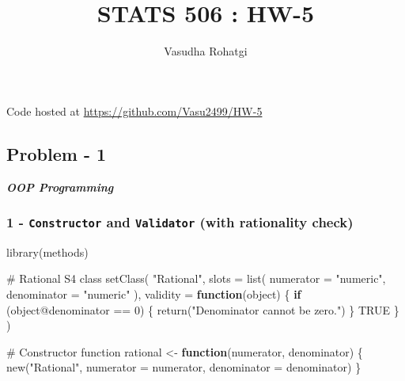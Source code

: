 \documentclass[
  12pt,
]{article}
\title{STATS 506 : HW-5}
\author{Vasudha Rohatgi}
\date{}
\makeatletter
\let\oldparagraph\paragraph
\renewcommand{\paragraph}{
    \@ifstar
      \xxxParagraphStar
      \xxxParagraphNoStar
  }
\newcommand{\xxxParagraphStar}[1]{\oldparagraph*{#1}\mbox{}}
\newcommand{\xxxParagraphNoStar}[1]{\oldparagraph{#1}\mbox{}}
\newenvironment{Shaded}{\begin{snugshade}}{\end{snugshade}}
\newcommand{\AttributeTok}[1]{\textcolor[rgb]{0.40,0.45,0.13}{#1}}
\newcommand{\CommentTok}[1]{\textcolor[rgb]{0.37,0.37,0.37}{#1}}
\newcommand{\ConstantTok}[1]{\textcolor[rgb]{0.56,0.35,0.01}{#1}}
\newcommand{\ControlFlowTok}[1]{\textcolor[rgb]{0.00,0.23,0.31}{\textbf{#1}}}
\newcommand{\DecValTok}[1]{\textcolor[rgb]{0.68,0.00,0.00}{#1}}
\newcommand{\FunctionTok}[1]{\textcolor[rgb]{0.28,0.35,0.67}{#1}}
\newcommand{\NormalTok}[1]{\textcolor[rgb]{0.00,0.23,0.31}{#1}}
\newcommand{\OtherTok}[1]{\textcolor[rgb]{0.00,0.23,0.31}{#1}}
\newcommand{\SpecialCharTok}[1]{\textcolor[rgb]{0.37,0.37,0.37}{#1}}
\newcommand{\StringTok}[1]{\textcolor[rgb]{0.13,0.47,0.30}{#1}}
\makeatother
\begin{document}
\maketitle


\paragraph{\texorpdfstring{Code hosted at
\url{https://github.com/Vasu2499/HW-5}}{Code hosted at https://github.com/Vasu2499/HW-5}}\label{code-hosted-at-httpsgithub.comvasu2499hw-5}

\subsection{Problem - 1}\label{problem---1}

\textbf{\emph{OOP Programming}}

\subsubsection{\texorpdfstring{1 - \texttt{Constructor} and
\texttt{Validator} (with rationality
check)~}{1 - Constructor and Validator (with rationality check)~}}\label{constructor-and-validator-with-rationality-check}

\begin{Shaded}
\begin{Highlighting}[]
\FunctionTok{library}\NormalTok{(methods)}

\CommentTok{\# Rational S4 class}
\FunctionTok{setClass}\NormalTok{(}
  \StringTok{"Rational"}\NormalTok{,}
  \AttributeTok{slots =} \FunctionTok{list}\NormalTok{(}
    \AttributeTok{numerator =} \StringTok{"numeric"}\NormalTok{,}
    \AttributeTok{denominator =} \StringTok{"numeric"}
\NormalTok{  ),}
  \AttributeTok{validity =} \ControlFlowTok{function}\NormalTok{(object) \{}
    \ControlFlowTok{if}\NormalTok{ (object}\SpecialCharTok{@}\NormalTok{denominator }\SpecialCharTok{==} \DecValTok{0}\NormalTok{) \{}
      \FunctionTok{return}\NormalTok{(}\StringTok{"Denominator cannot be zero."}\NormalTok{)}
\NormalTok{    \}}
    \ConstantTok{TRUE}
\NormalTok{  \}}
\NormalTok{)}

\CommentTok{\# Constructor function}
\NormalTok{rational }\OtherTok{\textless{}{-}} \ControlFlowTok{function}\NormalTok{(numerator, denominator) \{}
  \FunctionTok{new}\NormalTok{(}\StringTok{"Rational"}\NormalTok{, }\AttributeTok{numerator =}\NormalTok{ numerator, }\AttributeTok{denominator =}\NormalTok{ denominator)}
\NormalTok{\}}
\end{Highlighting}
\end{Shaded}
\end{document}
